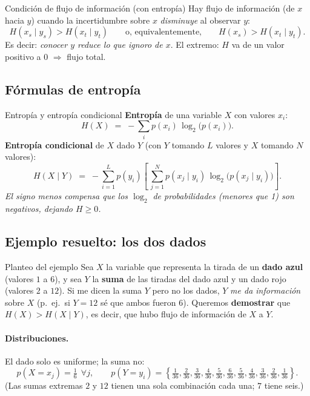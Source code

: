 \documentclass[11pt,a4paper]{article}
\begin{document}
\begin{defbox}{Condición de flujo de información (con entropía)}
Hay flujo de información (de $x$ hacia $y$) cuando la incertidumbre sobre $x$ \emph{disminuye}
al observar $y$:
\[
H(x_s \mid y_s) > H(x_t \mid y_t)
\qquad\text{o, equivalentemente,}\qquad
H(x_s) > H(x_t \mid y_t).
\]
Es decir: \emph{conocer $y$ reduce lo que ignoro de $x$}. El extremo: $H$ va de un valor
positivo a $0$ $\Rightarrow$ flujo total.
\end{defbox}

\subsection{Fórmulas de entropía}

\begin{defbox}{Entropía y entropía condicional}
\textbf{Entropía} de una variable $X$ con valores $x_i$:
\[
  H(X) \;=\; -\sum_i p(x_i)\,\log_2\!\bigl(p(x_i)\bigr).
\]
\textbf{Entropía condicional} de $X$ dado $Y$ (con $Y$ tomando $L$ valores y $X$ tomando $N$
valores):
\[
  H(X\mid Y) \;=\; -\sum_{i=1}^{L} p(y_i)
      \left[\, \sum_{j=1}^{N} p(x_j\mid y_i)\,\log_2\!\bigl(p(x_j\mid y_i)\bigr) \right].
\]
\emph{El signo menos compensa que los $\log_2$ de probabilidades (menores que 1) son
negativos, dejando $H \ge 0$.}
\end{defbox}

\subsection{Ejemplo resuelto: los dos dados}

\begin{practbox}{Planteo del ejemplo}
Sea $X$ la variable que representa la tirada de un \textbf{dado azul} (valores $1$ a $6$), y
sea $Y$ la \textbf{suma} de las tiradas del dado azul y un dado rojo (valores $2$ a $12$). Si
me dicen la suma $Y$ pero no los dados, $Y$ \emph{me da información} sobre $X$ (p.\ ej.\ si
$Y=12$ sé que ambos fueron $6$). Queremos \textbf{demostrar} que $H(X) > H(X\mid Y)$, es decir,
que hubo flujo de información de $X$ a $Y$.
\end{practbox}

\paragraph{Distribuciones.} El dado solo es uniforme; la suma no:
\[
p(X = x_j) = \tfrac{1}{6}\ \ \forall j,
\qquad
p(Y = y_i) = \left\{\tfrac{1}{36},\tfrac{2}{36},\tfrac{3}{36},\tfrac{4}{36},
\tfrac{5}{36},\tfrac{6}{36},\tfrac{5}{36},\tfrac{4}{36},\tfrac{3}{36},
\tfrac{2}{36},\tfrac{1}{36}\right\}.
\]
(Las sumas extremas $2$ y $12$ tienen una sola combinación cada una; $7$ tiene seis.)
\end{document}
